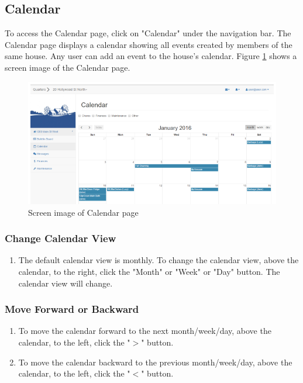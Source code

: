\documentclass[12pt]{article}
\begin{document}
    \subsection{Calendar}
    To access the Calendar page, click on "Calendar" under the navigation bar. The Calendar page displays a calendar showing all events created by members of the same house. Any user can add an event to the house's calendar. Figure \ref{fig:calendar} shows a screen image of the Calendar page.

    \begin{figure}
        \centering
        \includegraphics[width=\textwidth]{calendar}
        \caption{Screen image of Calendar page}
        \label{fig:calendar}
    \end{figure}

    \subsubsection{Change Calendar View}
    \begin{enumerate}
        \item The default calendar view is monthly. To change the calendar view, above the calendar, to the right, click the "Month" or "Week" or "Day" button. The calendar view will change.
    \end{enumerate}

    \subsubsection{Move Forward or Backward}
    \begin{enumerate}
        \item To move the calendar forward to the next month/week/day,  above the calendar, to the left, click the "$>$" button.
        \item To move the calendar backward to the previous month/week/day,  above the calendar, to the left, click the "$<$" button.
    \end{enumerate}
\end{document}
